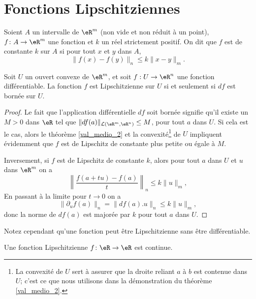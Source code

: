 \section{Fonctions Lipschitziennes}

\begin{definition}
	Soient $A$ un intervalle de $\eR^m$ (non vide et non réduit à un point), $f\colon A\to \eR^m$ une fonction et $k$ un réel strictement positif. On dit que $f$ est  de constante $k$ sur $A$ si pour tout $x$ et $y$ dans $A$,
	\begin{equation}
		\|  f(x)-f(y) \|_n\leq k\| x-y \|_m.
	\end{equation}
\end{definition}

\begin{proposition}
  Soit  $U$ un ouvert convexe  de $\eR^m$, et soit $f:U\to \eR^n$ une fonction différentiable. La fonction $f$ est Lipschitzienne sur $U$ si et seulement si $df$ est bornée sur $U$.  
\end{proposition}
\begin{proof}
	Le fait que l'application différentielle $df$ soit bornée signifie qu'il existe un $M>0$ dans $\eR$ tel que $\|df(a)\|_{\mathcal{L}(\eR^m,\eR^n)}\leq M$, pour tout $a$ dans $U$. Si cela est le cas, alors le théorème \ref{val_medio_2} et la convexité\footnote{La convexité de $U$ sert à assurer que la droite reliant $a$ à $b$ est contenue dans $U$; c'est ce que nous utilisons dans la démonstration du théorème \ref{val_medio_2}.} de $U$ impliquent évidemment que $f$ est de Lipschitz de constante plus petite ou égale à $M$.
	
	Inversement, si $f$ est de Lipschitz de constante $k$, alors pour tout $a$ dans $U$ et $u$ dans $\eR^m$ on a 
	\[
		\left\|\frac{f(a+tu)-f(a)}{t}\right\|_n\leq k \|u\|_m,
	\]   
	En passant à la limite pour $t\to 0$ on a 
	\[
		\|\partial_u f(a)\|_n=\|df(a).u\|_n\leq k \|u\|_m,
	\]
	donc la norme de $df(a)$ est majorée par $k$ pour tout $a$ dans $U$.   
\end{proof}

Notez cependant qu'une fonction peut être Lipschitzienne sans être différentiable.

\begin{proposition} \label{PropFZgFTEW}
    Une fonction Lipschitzienne \( f\colon \eR\to \eR\) est continue.
\end{proposition}

